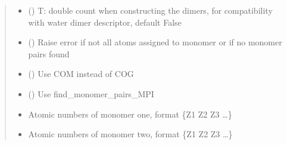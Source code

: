 \documentclass[letterpaper,10pt,english]{sphinxmanual}
\begin{document}
\begin{fulllineitems}
\begin{quote}
\begin{description}
\begin{itemize}
\item {} 
 () \textendash{} T: double count when constructing the dimers, for compatibility with water dimer descriptor, default False

\item {} 
 () \textendash{} Raise error if not all atoms assigned to monomer or if no monomer pairs found

\item {} 
 () \textendash{} Use COM instead of COG

\item {} 
 () \textendash{} Use find\_monomer\_pairs\_MPI

\item {} 
 \textendash{} Atomic numbers of monomer one, format \{Z1 Z2 Z3 …\}

\item {} 
 \textendash{} Atomic numbers of monomer two, format \{Z1 Z2 Z3 …\}

\end{itemize}

\end{description}\end{quote}

\end{fulllineitems}

\end{document}
